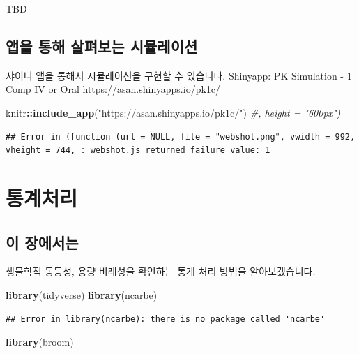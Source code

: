 \documentclass[12pt,]{krantz}
\newenvironment{Shaded}{\begin{snugshade}}{\end{snugshade}}
\newcommand{\KeywordTok}[1]{\textcolor[rgb]{0.13,0.29,0.53}{\textbf{#1}}}
\newcommand{\StringTok}[1]{\textcolor[rgb]{0.31,0.60,0.02}{#1}}
\newcommand{\CommentTok}[1]{\textcolor[rgb]{0.56,0.35,0.01}{\textit{#1}}}
\newcommand{\OperatorTok}[1]{\textcolor[rgb]{0.81,0.36,0.00}{\textbf{#1}}}
\newcommand{\NormalTok}[1]{#1}
\theoremstyle{definition}
\theoremstyle{definition}
\theoremstyle{definition}
\theoremstyle{remark}
\begin{document}
TBD

\section{앱을 통해 살펴보는 시뮬레이션}\label{---}

샤이니 앱을 통해서 시뮬레이션을 구현할 수 있습니다. Shinyapp: PK
Simulation - 1 Comp IV or Oral \url{https://asan.shinyapps.io/pk1c/}

\begin{Shaded}
\begin{Highlighting}[]
\NormalTok{knitr}\OperatorTok{::}\KeywordTok{include_app}\NormalTok{(}\StringTok{"https://asan.shinyapps.io/pk1c/"}\NormalTok{) }\CommentTok{#, height = "600px")}
\end{Highlighting}
\end{Shaded}

\begin{verbatim}
## Error in (function (url = NULL, file = "webshot.png", vwidth = 992, vheight = 744, : webshot.js returned failure value: 1
\end{verbatim}

\chapter{통계처리}\label{statistics}

\section{이 장에서는}\label{stat-intro}

생물학적 동등성, 용량 비례성을 확인하는 통계 처리 방법을 알아보겠습니다.

\begin{Shaded}
\begin{Highlighting}[]
\KeywordTok{library}\NormalTok{(tidyverse)}
\KeywordTok{library}\NormalTok{(ncarbe)}
\end{Highlighting}
\end{Shaded}

\begin{verbatim}
## Error in library(ncarbe): there is no package called 'ncarbe'
\end{verbatim}

\begin{Shaded}
\begin{Highlighting}[]
\KeywordTok{library}\NormalTok{(broom)}
\end{Highlighting}
\end{Shaded}
\end{document}
